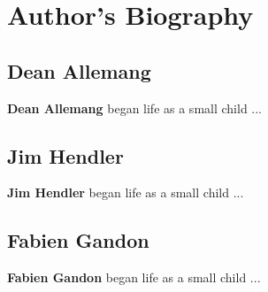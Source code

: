 \chapter*{Author's Biography}

\section*{Dean Allemang}

\textbf{Dean Allemang} began life as a small child ...

\section*{Jim Hendler}

\textbf{Jim Hendler} began life as a small child ...

\section*{Fabien Gandon}

\textbf{Fabien Gandon} began life as a small child ...

